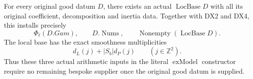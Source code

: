\begin{theorem}
\label{claim:DX8}
For every original good datum $D$, there exists an actual
$\operatorname{LocBase}D$ with all its original coefficient,
decomposition and inertia data.
Together with DX2 and DX4, this installs precisely
\[
 \Phi_\ell(D.Gam),\qquad D.\operatorname{Nums},\qquad
                  \operatorname{Nonempty}(\operatorname{LocBase}D).
 \tag{DX.40}
\]
The local base has the exact smoothness multiplicities
\[
                       d_L(j)+|S_b|d_P(j)
                           \qquad(j\in\mathbb Z^2).
 \tag{DX.41}
\]
Thus these three actual arithmetic inputs in the literal
$\operatorname{exModel}$ constructor require no remaining
bespoke supplier once the original good datum is supplied.
\end{theorem}

